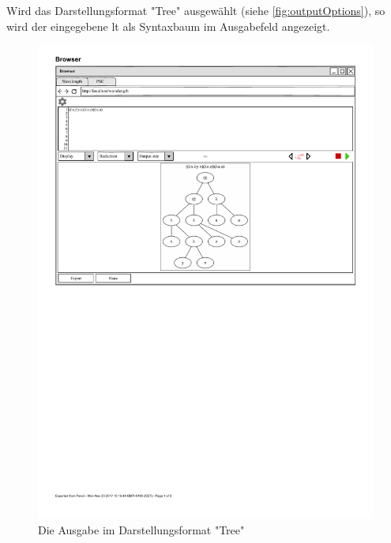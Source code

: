 \documentclass[parskip=full,11pt,twoside]{scrartcl}
\begin{document}
Wird das Darstellungsformat "Tree" ausgewählt (siehe \cref{fig:outputOptions}), so wird der eingegebene \gls{lt} als Syntaxbaum im Ausgabefeld angezeigt.
\begin{figure}[H]
	\centering
	\includegraphics[width=\textwidth]{img/displayTree1}
	\caption{Die Ausgabe im Darstellungsformat "Tree"}
\end{figure}
\end{document}

